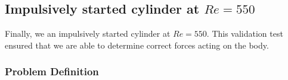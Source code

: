 %     
%     

\subsection{Impulsively started cylinder at $Re=550$}
\label{subsec:eul_isc}
Finally, we an impulsively started cylinder at $Re=550$. This validation test ensured that we are able to determine correct forces acting on the body. 

\subsubsection*{Problem Definition}

